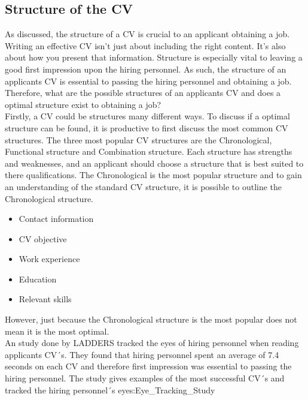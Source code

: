 \subsection{Structure of the CV} \label{Structure of the CV}
As discussed, the structure of a CV is crucial to an applicant obtaining a job.
Writing an effective CV isn't just about including the right content. 
It's also about how you present that information.
Structure is especially vital to leaving a good first impression upon the hiring personnel.
As such, the structure of an applicants CV is essential to passing the hiring personnel and obtaining a job.
Therefore, what are the possible structures of an applicants CV and does a optimal structure exist to obtaining a job? \\


Firstly, a CV could be structures many different ways.
To discuss if a optimal structure can be found, it is productive to first discuss the most common CV structures.
The three most popular CV structures are the Chronological, Functional structure and Combination structure. \cite{Tips_for_best_format}
Each structure has strengths and weaknesses, and an applicant should choose a structure that is best suited to there qualifications.
The Chronological is the most popular structure and to gain an understanding of the standard CV structure, it is possible to outline the Chronological structure.
\begin{itemize}
   \item  Contact information
   \item  CV objective
   \item  Work experience
   \item  Education
   \item  Relevant skills
   \end{itemize}
However, just because the Chronological structure is the most popular does not mean it is the most optimal. \\

An study done by LADDERS tracked the eyes of hiring personnel when reading applicants CV´s. \cite{Eye_Tracking_Study}
They found that hiring personnel spent an average of 7.4 seconds on each CV and therefore first impression was essential to passing the hiring personnel. 
The study gives examples of the most successful CV´s and tracked the hiring personnel´s eyes:Eye_Tracking_Study 

